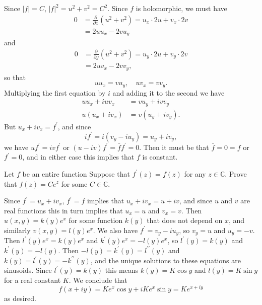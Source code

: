 \documentclass{article}
\newcounter{Problem}
\newenvironment{Problem}{\begin{Exercise}[name={Problem},
                                          counter={Problem}]}
                        {\end{Exercise}}
\begin{document}
\begin{Answer}
  Since $|f| = C$, $|f|^2 = u^2 + v^2 = C^2$. Since $f$ is
  holomorphic, we must have
  \begin{align*}
    0 &= \frac{\partial}{\partial x} (u^2 + v^2)
       = u_x \cdot 2 u + v_x \cdot 2 v \\
      &= 2 u u_x - 2 v u_y
  \end{align*}
  and
  \begin{align*}
    0 &= \frac{\partial}{\partial y} (u^2 + v^2)
       = u_y \cdot 2 u + v_y \cdot 2 v \\
      &= 2 u v_x - 2 v v_y,
  \end{align*}
  so that
  $$
  u u_x = v u_y, \quad
  u v_x = v v_y.
  $$
  Multiplying the first equation by $i$ and adding it to the second we
  have
  \begin{align*}
  u u_x + i u v_x &= v u_y + i v v_y \\
  u (u_x + i v_x) &= v (u_y + i v_y).
  \end{align*}
  But $u_x + i v_x = f^\prime$, and since
  $$
  i f^\prime = i(v_y - i u_y) = u_y + i v_y,
  $$
  we have $u f^\prime = i v f^\prime$ or
  $(u - iv)f^\prime = \bar{f} f^\prime = 0$. Then it must be that
  $\bar{f} = 0 = f$ or $f^\prime = 0$, and in either case this implies that $f$
  is constant.
\end{Answer}

\begin{Problem}
  Let $f$ be an entire function Suppose that $f^\prime(z) = f(z)$ for
  any $z \in \mathbb{C}$. Prove that $f(z) = C e^z$ for some
  $C \in \mathbb{C}$.
\end{Problem}

\begin{Answer}
Since $f^\prime = u_x + i v_x$, $f^\prime = f$ implies
that $u_x + i v_x = u + i v$, and since $u$ and $v$ are
real functions this in turn implies that $u_x = u$ and
$v_x = v$. Then $u(x, y) = k(y) e^x$ for some function
$k(y)$ that does not depend on $x$, and similarly
$v(x, y) = l(y) e^x$.
We also have $f^\prime = v_y - i u_y$, so
$v_y = u$ and $u_y = -v$. Then
$l^\prime(y) e^x = k(y) e^x$ and
$k^\prime(y) e^x = -l(y) e^x$, so
$l^\prime(y) = k(y)$ and
$k^\prime(y) = -l(y)$. Then
$-l(y) = k^\prime(y) = l^{\prime\prime}(y)$
and $k(y) = l^\prime(y) = -k^{\prime\prime}(y)$, and the unique
solutions to these equations are sinusoids.
Since $l^\prime(y) = k(y)$ this means
$k(y) = K \cos y$ and $l(y) = K \sin y$
for a real constant $K$. We conclude that
$$
  f(x + iy)
= K e^x \cos y + i K e^x \sin y
= K e^{x + iy}
$$
as desired.
\end{Answer}
\end{document}
